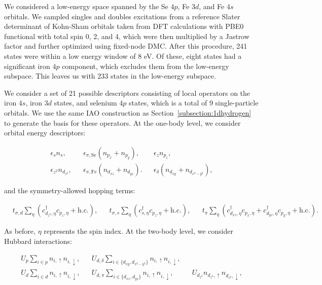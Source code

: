 \documentclass[aps, prb, 11pt]{revtex4-1}
\begin{document}
We considered a low-energy space spanned by the Se $4p$, Fe $3d$, and Fe $4s$ orbitals. We sampled singles and doubles excitations from a reference Slater determinant 
of Kohn-Sham orbitals taken from DFT calculations with PBE0 functional with total spin 0, 2, and 4, which were then multiplied by a Jastrow factor and further optimized using fixed-node DMC. 
After this procedure, 241 states were within a low energy window of 8 eV. 
Of these, eight states had a significant iron $4p$ component, which excludes them from the low-energy subspace. 
This leaves us with 233 states in the low-energy subspace.

We consider a set of 21 possible descriptors consisting of local operators on the iron $4s$, iron $3d$ states, and selenium $4p$ states, which is a total of 9 single-particle orbitals.
We use the same IAO construction as Section~\ref{subsection:1dhydrogen} to generate the basis for these operators.
At the one-body level, we consider orbital energy descriptors: 

\begin{align}
  &\epsilon_{s} n_s,&
  &\epsilon_{\pi,\mathrm{Se}} (n_{p_x} + n_{p_y}), &
  &\epsilon_{z} n_{p_z},&
  \nonumber \\
  &\epsilon_{z^2} n_{d_{z^2}},& 
  &\epsilon_{\pi,\mathrm{Fe}} (n_{d_{xz}} + n_{d_{yz}}).& 
  &\epsilon_{\delta} (n_{d_{xy}} + n_{d_{x^2-y^2}}),&
\end{align}

and the symmetry-allowed hopping terms:

\begin{align}
  &t_{\sigma,d} \sum_{\eta} \left( c_{d_{z^2},\eta}^{\dagger} c_{p_z,\eta} + \text{h.c.} \right),&
  &t_{\sigma,s} \sum_{\eta} \left(c_{s,\eta}^{\dagger}  c_{p_z,\eta} + \text{h.c.} \right),&
  &t_{\pi} \sum_{\eta} \left(c_{d_{xz},\eta}^{\dagger}  c_{p_x,\eta} + c_{d_{yz},\eta}^{\dagger}  c_{p_y,\eta} + \text{h.c.} \right).&
\end{align}

As before, $\eta$ represents the spin index. At the two-body level, we consider Hubbard interactions:

\begin{align}
  &U_p \sum_{i \in p} n_{i,\uparrow} n_{i,\downarrow},&
  &U_{d,\delta} \sum_{i\in \{d_{xy},d_{x^2-y^2}\}} n_{i,\uparrow} n_{i,\downarrow},&
  \nonumber \\
  &U_d \sum_{i \in d} n_{i,\uparrow} n_{i,\downarrow},&
  &U_{d,\pi} \sum_{i\in \{d_{xz},d_{yz}\}} n_{i,\uparrow} n_{i,\downarrow},&
  &U_{d_{z^2}} n_{d_{z^2},\uparrow} n_{d_{z^2},\downarrow},&
\end{align}
\end{document}
